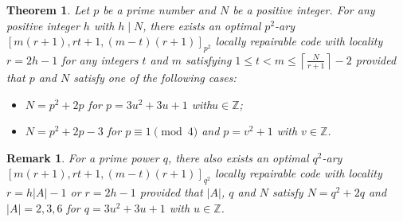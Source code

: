 \documentclass[journal,12pt,onecolumn]{IEEEtran}
\newtheorem{theorem}{Theorem}
\newtheorem{remark}{Remark}
\begin{document}
\begin{theorem}\label{opt_LRC_one_2h}
    Let \( p \) be a prime number and \(N\) be a positive integer. For any positive integer \( h \) with \(h\mid N\), there exists an optimal \( p^2 \)-ary \([m(r+1), rt+1, (m-t)(r+1)]_{p^2}\) locally repairable code with locality \( r = 2h - 1 \) for any integers \( t \) and \( m \) satisfying \(1 \leq t < m \leq \left\lceil \frac{N}{r+1} \right\rceil-2 \) provided that \( p \) and \(N\) satisfy one of the following cases:
    \begin{itemize}
        \item[(i)] \(N = p^2 + 2p\) for \(p = 3u^2 + 3u + 1\) with\(u\in\mathbb{Z}\);
        \item[(ii)] \(N = p^2 + 2p - 3\) for \( p \equiv 1 \pmod{4} \) and \(p = v^2 + 1\) with \(v\in\mathbb{Z}\).
    \end{itemize}
\end{theorem}

\begin{remark}
    For a prime power \(q\), there also exists an optimal \( q^2 \)-ary \([m(r+1), rt+1, (m-t)(r+1)]_{q^2}\) locally repairable code with locality \( r = h|A| - 1 \) or \( r = 2h - 1 \) provided that \(|A|\), \( q \) and \(N\) satisfy \(N = q^2 + 2q\) and \(|A| = 2,3,6\) for \(q = 3u^2 + 3u + 1\) with \(u\in\mathbb{Z}\). 
\end{remark}
\end{document}
